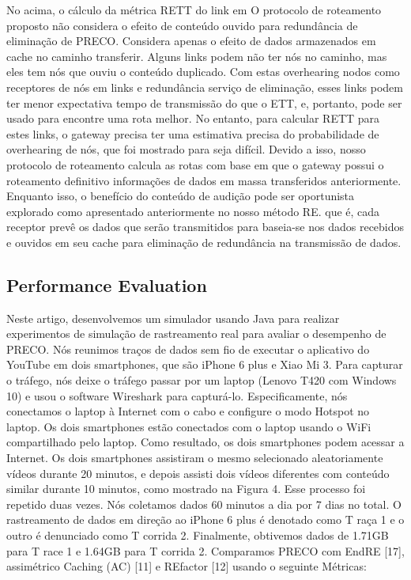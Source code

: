 \documentclass[12pt]{article}
\begin{document}
\begin{enumerate}
		
		No acima, o cálculo da métrica RETT do link em
		O protocolo de roteamento proposto não considera o efeito
		de conteúdo ouvido para redundância de eliminação de PRECO.
		Considera apenas o efeito de dados armazenados em cache no caminho
		transferir. Alguns links podem não ter nós no caminho, mas eles
		tem nós que ouviu o conteúdo duplicado. Com estas
		overhearing nodos como receptores de nós em links e redundância
		serviço de eliminação, esses links podem ter menor expectativa
		tempo de transmissão do que o ETT, e, portanto, pode ser usado para
		encontre uma rota melhor. No entanto, para calcular RETT para estes
		links, o gateway precisa ter uma estimativa precisa do
		probabilidade de overhearing de nós, que foi mostrado para
		seja difícil. Devido a isso, nosso protocolo de roteamento calcula
		as rotas com base em que o gateway possui o roteamento definitivo
		informações de dados em massa transferidos anteriormente. Enquanto isso,
		o benefício do conteúdo de audição pode ser oportunista
		explorado como apresentado anteriormente no nosso método RE. que
		é, cada receptor prevê os dados que serão transmitidos para
		baseia-se nos dados recebidos e ouvidos em seu cache para
		eliminação de redundância na transmissão de dados.
	\end{enumerate}

\subsection{Performance Evaluation}


Neste artigo, desenvolvemos um simulador usando Java para
realizar experimentos de simulação de rastreamento real para avaliar
o desempenho de PRECO. Nós reunimos traços de dados sem fio
de executar o aplicativo do YouTube em dois smartphones, que são
iPhone 6 plus e Xiao Mi 3. Para capturar o tráfego, nós
deixe o tráfego passar por um laptop (Lenovo T420 com Windows
10) e usou o software Wireshark para capturá-lo. Especificamente,
nós conectamos o laptop à Internet com o cabo e
configure o modo Hotspot no laptop. Os dois smartphones
estão conectados com o laptop usando o WiFi compartilhado pelo laptop.
Como resultado, os dois smartphones podem acessar a Internet.
Os dois smartphones assistiram o mesmo selecionado aleatoriamente
vídeos durante 20 minutos, e depois assisti dois vídeos diferentes
com conteúdo similar durante 10 minutos, como mostrado na Figura 4.
Esse processo foi repetido duas vezes. Nós coletamos dados 60 minutos a
dia por 7 dias no total. O rastreamento de dados em direção ao iPhone 6 plus
é denotado como T raça 1 e o outro é denunciado como T corrida 2.
Finalmente, obtivemos dados de 1.71GB para T race 1 e 1.64GB para
T corrida 2. Comparamos PRECO com EndRE [17], assimétrico
Caching (AC) [11] e REfactor [12] usando o seguinte
Métricas:
\end{document}
